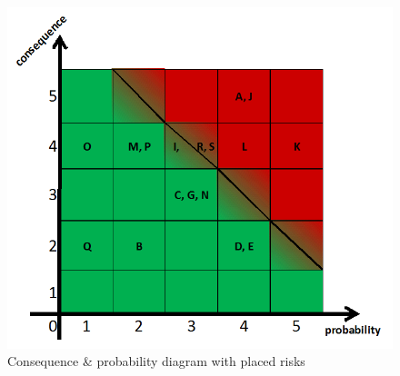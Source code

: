\begin{figure}[h!]
\centering
\label{cxp}
\includegraphics[scale=0.6]{./graphics/cxp}
\caption{Consequence \& probability diagram with placed risks}
\end{figure}